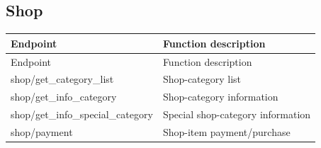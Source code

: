 \subsection{Shop}

\begin{longtable}{>{\ttfamily}p{}p{}}
\toprule
Endpoint & Function description \\
\midrule
\endfirsthead%

\toprule
Endpoint & Function description \\
\midrule
\endhead%

shop/get\_category\_list
    & Shop-category list \\

shop/get\_info\_category
    & Shop-category information \\

shop/get\_info\_special\_category
    & Special shop-category information \\

shop/payment
    & Shop-item payment/purchase \\

\bottomrule
\end{longtable}